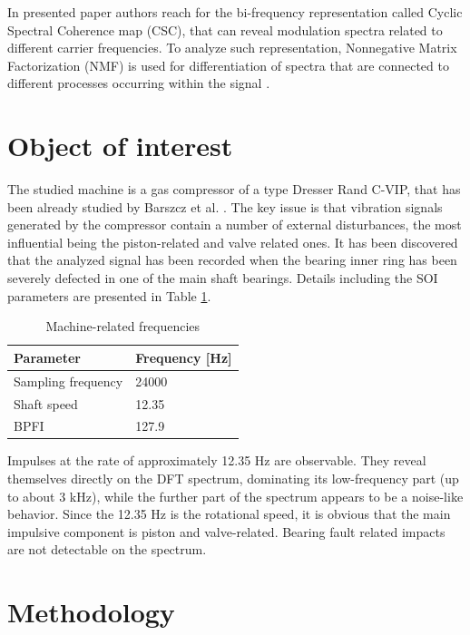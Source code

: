 \documentclass[10pt]{article}
\begin{document}
In presented paper authors reach for the bi-frequency representation called Cyclic Spectral Coherence map (CSC), that can reveal modulation spectra related to different carrier frequencies. To analyze such representation, Nonnegative Matrix Factorization (NMF) is used for differentiation of spectra that are connected to different processes occurring within the signal \cite{wang2013nonnegative,lee1999learning,he2011symmetric}. 

\section{Object of interest}

The studied machine is a gas compressor of a type Dresser Rand C-VIP, that has been already studied by Barszcz et al. \cite{barszcz2013bearings}. The key issue is that vibration signals generated by the compressor contain a number of external disturbances, the most influential being the piston-related and valve related ones. It has been discovered that the analyzed signal has been recorded when the bearing inner ring has been severely defected in one of the main shaft bearings. Details including the SOI parameters are presented in Table \ref{tab:tab1}. 

\begin{table}[ht!]
    \centering
    \caption{Machine-related frequencies}
    \begin{tabular}{|l|l|}
    \hline
         \textbf{Parameter} & \textbf{Frequency [Hz]} \\ \hline
         Sampling frequency & 24000 \\ \hline
         Shaft speed & 12.35 \\ \hline
         BPFI & 127.9 \\ 
    \hline
    \end{tabular}
    \label{tab:tab1}
\end{table}

Impulses at the rate of approximately 12.35 Hz are observable. They reveal themselves directly on the DFT spectrum, dominating its low-frequency part (up to about 3 kHz), while the further part of the spectrum appears to be a noise-like behavior. Since the 12.35 Hz is the rotational speed, it is obvious that the main impulsive component is piston and valve-related. Bearing fault related impacts are not detectable on the spectrum.

\section{Methodology}
\end{document}
